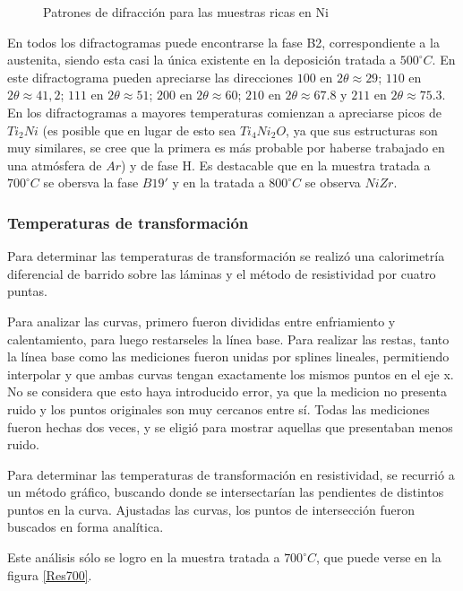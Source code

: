 \documentclass[12pt]{article}
\theoremstyle{definition}
\theoremstyle{remark}
\begin{document}
\begin{figure}[H]
\caption{Patrones de difracción para las muestras ricas en Ni}
\label{RXNiRich}
\end{figure}

En todos los difractogramas puede encontrarse la fase B2, correspondiente a la austenita, siendo esta casi la única existente en la deposición tratada a $500 ^\circ C$. En este difractograma pueden apreciarse las direcciones $100$ en $2\theta \approx 29$; $110$ en $2\theta \approx 41,2$; $111$ en $2\theta \approx 51$; $200$ en $2\theta \approx 60$; $210$ en $2\theta \approx 67.8$ y $211$ en $2\theta \approx 75.3$. En los difractogramas a mayores temperaturas comienzan a apreciarse picos de $Ti_2Ni$ (es posible que en lugar de esto sea $Ti_4Ni_2O$, ya que sus estructuras son muy similares, se cree que la primera es más probable por haberse trabajado en una atmósfera de $Ar$) y de fase H. Es destacable que en la muestra tratada a $700 ^\circ C$ se obersva la fase $B19'$ y en la tratada a $800 ^\circ C$ se observa $NiZr$.

\subsubsection{Temperaturas de transformación}
Para determinar las temperaturas de transformación se realizó una calorimetría diferencial de barrido sobre las láminas y el método de resistividad por cuatro puntas.

Para analizar las curvas, primero fueron divididas entre enfriamiento y calentamiento, para luego restarseles la línea base. Para realizar las restas, tanto la línea base como las mediciones fueron unidas por splines lineales, permitiendo interpolar y que ambas curvas tengan exactamente los mismos puntos en el eje x. No se considera que esto haya introducido error, ya que la medicion no presenta ruido y los puntos originales son muy cercanos entre sí. Todas las mediciones fueron hechas dos veces, y se eligió para mostrar aquellas que presentaban menos ruido.

Para determinar las temperaturas de transformación en resistividad, se recurrió a un método gráfico, buscando donde se intersectarían las pendientes de distintos puntos en la curva. Ajustadas las curvas, los puntos de intersección fueron buscados en forma analítica.

Este análisis sólo se logro en la muestra tratada a $700 ^\circ C$, que puede verse en la figura \ref{Res700}.
\end{document}
